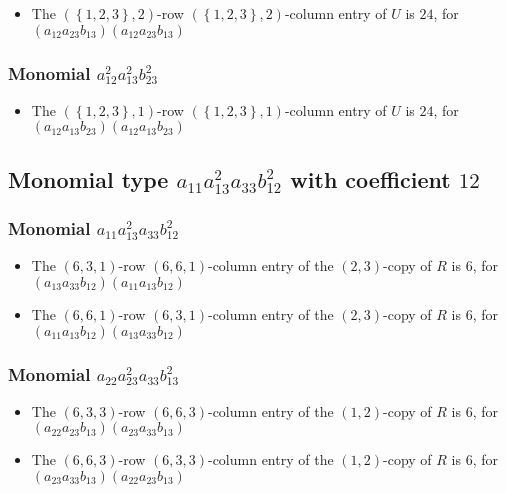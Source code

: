 \documentclass{article}
\begin{document}
\begin{itemize}
\item The $ \left(\left\{1, 2, 3\right\}, 2\right) $-row $ \left(\left\{1, 2, 3\right\}, 2\right) $-column entry of $U$ is $ 24 $, for $( a_{12} a_{23} b_{13} )( a_{12} a_{23} b_{13} )$ 
\end{itemize}
\subsubsection{Monomial $ a_{12}^{2} a_{13}^{2} b_{23}^{2} $}

\begin{itemize}
\item The $ \left(\left\{1, 2, 3\right\}, 1\right) $-row $ \left(\left\{1, 2, 3\right\}, 1\right) $-column entry of $U$ is $ 24 $, for $( a_{12} a_{13} b_{23} )( a_{12} a_{13} b_{23} )$ 
\end{itemize}
\subsection{Monomial type $ a_{11} a_{13}^{2} a_{33} b_{12}^{2} $ with coefficient $ 12 $}

\subsubsection{Monomial $ a_{11} a_{13}^{2} a_{33} b_{12}^{2} $}

\begin{itemize}
\item The $(6, 3, 1)$-row $(6, 6, 1)$-column entry of the $ \left(2, 3\right) $-copy of $R$ is $ 6 $, for $( a_{13} a_{33} b_{12} )( a_{11} a_{13} b_{12} )$ 
\item The $(6, 6, 1)$-row $(6, 3, 1)$-column entry of the $ \left(2, 3\right) $-copy of $R$ is $ 6 $, for $( a_{11} a_{13} b_{12} )( a_{13} a_{33} b_{12} )$ 
\end{itemize}
\subsubsection{Monomial $ a_{22} a_{23}^{2} a_{33} b_{13}^{2} $}

\begin{itemize}
\item The $(6, 3, 3)$-row $(6, 6, 3)$-column entry of the $ \left(1, 2\right) $-copy of $R$ is $ 6 $, for $( a_{22} a_{23} b_{13} )( a_{23} a_{33} b_{13} )$ 
\item The $(6, 6, 3)$-row $(6, 3, 3)$-column entry of the $ \left(1, 2\right) $-copy of $R$ is $ 6 $, for $( a_{23} a_{33} b_{13} )( a_{22} a_{23} b_{13} )$ 
\end{itemize}
\end{document}

